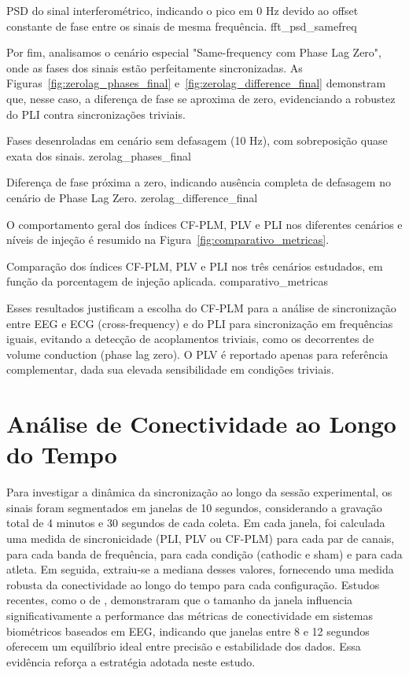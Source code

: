 {PSD do sinal interferométrico, indicando o pico em 0 Hz devido ao offset constante de fase entre os sinais de mesma frequência.}
{fft_psd_samefreq}

Por fim, analisamos o cenário especial "Same-frequency com Phase Lag Zero", onde as fases dos sinais estão perfeitamente sincronizadas. As Figuras~\ref{fig:zerolag_phases_final} e~\ref{fig:zerolag_difference_final} demonstram que, nesse caso, a diferença de fase se aproxima de zero, evidenciando a robustez do PLI contra sincronizações triviais.

{Fases desenroladas em cenário sem defasagem (10 Hz), com sobreposição quase exata dos sinais.}
{zerolag_phases_final}

{Diferença de fase próxima a zero, indicando ausência completa de defasagem no cenário de Phase Lag Zero.}
{zerolag_difference_final}


O comportamento geral dos índices CF-PLM, PLV e PLI nos diferentes cenários e níveis de injeção é resumido na Figura~\ref{fig:comparativo_metricas}.

{Comparação dos índices CF-PLM, PLV e PLI nos três cenários estudados, em função da porcentagem de injeção aplicada.}
{comparativo_metricas}

Esses resultados justificam a escolha do CF-PLM para a análise de sincronização entre EEG e ECG (cross-frequency) e do PLI para sincronização em frequências iguais, evitando a detecção de acoplamentos triviais, como os decorrentes de volume conduction (phase lag zero). O PLV é reportado apenas para referência complementar, dada sua elevada sensibilidade em condições triviais.

\section{Análise de Conectividade ao Longo do Tempo}
\label{sec:connectivity_over_time}

Para investigar a dinâmica da sincronização ao longo da sessão experimental, os sinais foram segmentados em janelas de 10 segundos, considerando a gravação total de 4 minutos e 30 segundos de cada coleta. Em cada janela, foi calculada uma medida de sincronicidade (PLI, PLV ou CF-PLM) para cada par de canais, para cada banda de frequência, para cada condição (cathodic e sham) e para cada atleta. Em seguida, extraiu-se a mediana desses valores, fornecendo uma medida robusta da conectividade ao longo do tempo para cada configuração. Estudos recentes, como o de \citet{didaci2024how}, demonstraram que o tamanho da janela influencia significativamente a performance das métricas de conectividade em sistemas biométricos baseados em EEG, indicando que janelas entre 8 e 12 segundos oferecem um equilíbrio ideal entre precisão e estabilidade dos dados. Essa evidência reforça a estratégia adotada neste estudo.

